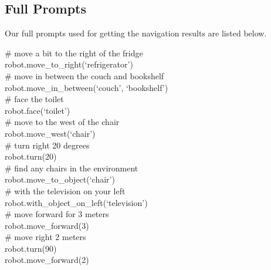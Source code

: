 \documentclass[letterpaper, 10 pt, conference]{ieeeconf}  %
\newcommand{\prompt}[1]{\textcolor{prompt-gray}{#1}}
\newcommand{\lmp}[1]{
\begin{tcolorbox}[boxsep=0pt,
                  left=3pt,
                  right=-4pt,
                  top=3pt,
                  bottom=3pt,
                  arc=0pt,
                  boxrule=0.5pt,
                  colframe=light-gray,
                  colback=white
                  ]
\small{  %
\ttfamily
#1
}
\end{tcolorbox}
}
\begin{document}
\subsection{Full Prompts}\label{sec:full-prompts}
Our full prompts used for getting the navigation results are listed below.
\lmp{
\prompt{
\# move a bit to the right of the fridge\\
robot.move\_to\_right(`refrigerator')\\
\# move in between the couch and bookshelf\\
robot.move\_in\_between(`couch', `bookshelf')\\
\# face the toilet\\
robot.face(`toilet')\\
\# move to the west of the chair\\
robot.move\_west(`chair')\\
\# turn right 20 degrees\\
robot.turn(20)\\
\# find any chairs in the environment\\
robot.move\_to\_object(`chair')\\
\# with the television on your left\\
robot.with\_object\_on\_left(`television')\\
\# move forward for 3 meters\\
robot.move\_forward(3)\\
\# move right 2 meters\\
robot.turn(90)\\
robot.move\_forward(2)\\
}
}
\end{document}
